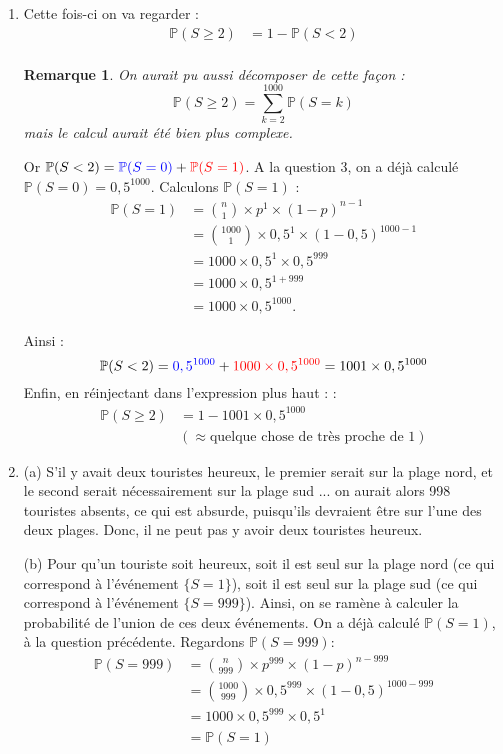 \documentclass[a4paper,oneside,12pt]{article}
\theoremstyle{plain}
\newtheorem*{remark}{Remarque}
\def\P{{\mathbb P}}
\begin{document}
\begin{enumerate}
    \item Cette fois-ci on va regarder :
    \begin{align*}
        \P(S\ge 2) &= 1 - \P(S<2)\\
    \end{align*}
    \begin{remark}
    On aurait pu aussi décomposer de cette façon :
    $$\P(S\ge 2) = \sum_{k=2}^{1000} \P(S=k)$$
    mais le calcul aurait été bien plus complexe.
    \end{remark}
    Or $ \P(S<2) = \color{blue}\P(S=0)\color{black} + \color{red}\P(S=1)\color{black}$. A la question 3, on a déjà calculé $\P(S=0) = 0,5^{1000}$. Calculons $\P(S=1)$ :
    \begin{align*}
        \P(S=1)&= \binom{n}{1} \times p^1 \times (1-p)^{n-1} \\
        &= \binom{1000}{1} \times 0,5^1 \times (1-0,5)^{1000-1}\\
        &= 1000 \times 0,5^1 \times 0,5^{999}\\
        &= 1000\times 0,5^{1 + 999}\\
        &= 1000 \times 0,5^{1000} .
    \end{align*}
    
    Ainsi :
    $$\P(S<2) = \color{blue}0,5^{1000}\color{black}+\color{red}1000 \times 0,5^{1000} \color{black}= 1001 \times 0,5^{1000}$$
    Enfin, en réinjectant dans l'expression plus haut : :
    \begin{align*}
        \P(S\ge 2) &= 1 - 1001 \times 0,5^{1000} \\
        &(\approx \mbox{quelque chose de très proche de 1})
    \end{align*}
    
    \item (a) S'il y avait deux touristes heureux, le premier serait sur la plage nord, et le second serait nécessairement sur la plage sud ... on aurait alors 998 touristes absents, ce qui est absurde, puisqu'ils devraient être sur l'une des deux plages. Donc, il ne peut pas y avoir deux touristes heureux.
    
    (b) Pour qu'un touriste soit heureux, soit il est seul sur la plage nord (ce qui correspond à l'événement $\{S=1\}$), soit il est seul sur la plage sud (ce qui correspond à l'événement $\{S=999\}$).
    Ainsi, on se ramène à calculer la probabilité de l'union de ces deux événements. On a déjà calculé $\P(S=1)$, à la question précédente. Regardons $\P(S=999)$: 
    \begin{align*}
        \P(S=999)&= \binom{n}{999} \times p^{999} \times (1-p)^{n-999} \\
        &= \binom{1000}{999} \times 0,5^{999} \times (1-0,5)^{1000-999} \\
        &=1000 \times 0,5^{999}\times 0,5^{1}\\
        &= \P(S=1)
    \end{align*}
    

\end{enumerate}
\end{document}
